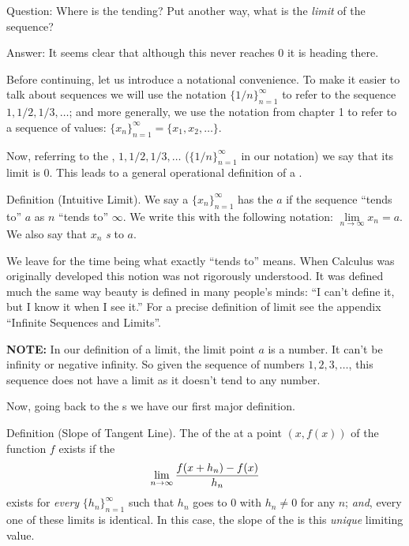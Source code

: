 Question: Where is the  tending? Put another way, what is the 
{\it limit\/} of the sequence?

Answer: It seems clear that although this  never reaches 0 it is heading
there. 

Before continuing, let us introduce a notational convenience.
To make it easier to talk about sequences we will use the 
notation $\{1/n\}_{n=1}^{\infty}$ 
to refer to the sequence $1, 1/2, 1/3, \ldots$; and more generally, 
we use the notation from chapter 1 to refer to a sequence of values: 
$\{x_n\}_{n=1}^{\infty} = \{x_1, x_2, \ldots\}$.

Now, referring to the , $1, 1/2, 1/3, \ldots$ 
($\{1/n\}_{n=1}^{\infty}$ in our notation) we 
say that its limit is $0$.
This leads to a general operational definition of a .

\proclaim Definition (Intuitive Limit). We say a  
$\{x_n\}_{n=1}^{\infty}$ has the  $a$ if the 
sequence ``tends to'' $a$ as $n$ ``tends to'' $\infty$. We write 
this with the following notation: $\lim\limits_{n \rightarrow \infty} x_n = a$.
We also say that $x_n$ {\it {}s\/} to $a$.

We leave for the time being what exactly ``tends to'' means. When Calculus 
was originally developed this notion was not rigorously understood. It 
was defined much the same way beauty is defined in many people's minds:
``I can't define it, but I know it when I see it.'' For a precise definition 
of limit see the appendix ``Infinite Sequences and Limits''.

{\bf NOTE:\/} In our definition of a limit, the limit point $a$ is a number. It can't be infinity or negative infinity.
So given the sequence of numbers $1, 2, 3, \ldots$, this sequence does not have a limit as it doesn't tend to any number.

Now, going back to the s we have our first major 
definition.

\proclaim Definition (Slope of Tangent Line). The  of the 
 at a point $(x,f(x))$ 
of the function $f$ exists if the 
$$
\lim_{n \rightarrow \infty} {f(x+h_n) - f(x) \over h_n}
$$
exists for {\it every\/}  $\{h_n\}_{n=1}^\infty$ such that $h_n$ goes to 0 with $h_n \ne 0$ for any $n$;
{\it and\/}, every one of these limits is identical.
In this case, the slope of the  is this {\it unique\/} limiting value. 

